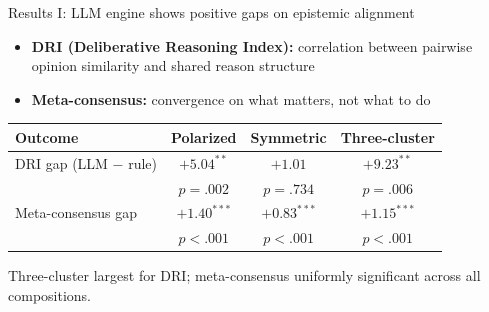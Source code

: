 \documentclass[aspectratio=169,11pt]{beamer}
\begin{document}
\begin{frame}{Results I: LLM engine shows positive gaps on epistemic alignment}

\begin{itemize}
    \item \textbf{DRI (Deliberative Reasoning Index):} correlation between pairwise opinion similarity and shared reason structure
    \item \textbf{Meta-consensus:} convergence on what matters, not what to do
\end{itemize}

\vspace{0.3cm}
\begin{table}
\centering
\small
\begin{tabular}{lccc}
\toprule
\textbf{Outcome} & \textbf{Polarized} & \textbf{Symmetric} & \textbf{Three-cluster} \\
\midrule
DRI gap (LLM $-$ rule) & $+5.04^{**}$ & $+1.01$ & $+9.23^{**}$ \\
 & {\scriptsize $p = .002$} & {\scriptsize $p = .734$} & {\scriptsize $p = .006$} \\[4pt]
Meta-consensus gap & $+1.40^{***}$ & $+0.83^{***}$ & $+1.15^{***}$ \\
 & {\scriptsize $p < .001$} & {\scriptsize $p < .001$} & {\scriptsize $p < .001$} \\
\bottomrule
\end{tabular}
\end{table}

\vspace{0.2cm}
{\small Three-cluster largest for DRI; meta-consensus uniformly significant across all compositions.}

\end{frame}
\end{document}

